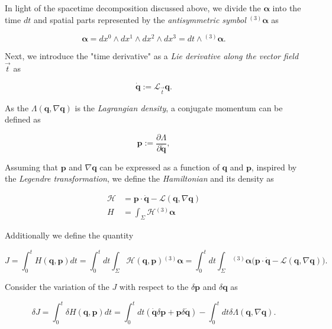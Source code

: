 In light of the spacetime decomposition discussed above, we divide the $\boldsymbol{\alpha}$ into the time $dt$ and spatial parts represented by the \textit{antisymmetric symbol} ${^{(3)}\boldsymbol{\alpha}}$ as 

\begin{equation}
\boldsymbol{\alpha} = dx^0 \wedge dx^1 \wedge dx^2 \wedge dx^3 = dt \wedge {^{(3)}\boldsymbol{\alpha}}.
\end{equation}

Next, we introduce the "time derivative" as a \textit{Lie derivative along the vector field} $\vec{t}$ as 

\begin{equation}
\dot{\boldsymbol{q}} := \mathcal{L}_{\vec{t}}\boldsymbol{q}.
\end{equation}

As the $\Lambda(\boldsymbol{q}, \nabla\boldsymbol{q})$ is the \textit{Lagrangian density}, a conjugate momentum can be defined as 

\begin{equation}
\boldsymbol{p} := \frac{\partial\Lambda}{\partial\dot{\boldsymbol{q}}},
\end{equation}

Assuming that $\boldsymbol{p}$ and $\nabla\boldsymbol{q}$ can be expressed as a function of $\boldsymbol{q}$ and $\boldsymbol{p}$, inspired by the \textit{Legendre transformation}, we define the \textit{Hamiltonian} and its density as

\begin{align}
\mathcal{H} &= \boldsymbol{p}\cdot\dot{\boldsymbol{q}} - \mathcal{L}(\boldsymbol{q}, \nabla\boldsymbol{q}) \\
H &= \int_{\Sigma}\mathcal{H}{^{(3)}\boldsymbol{\alpha}}
\end{align}

Additionally we define the quantity 

\begin{equation}
J = \int_{0}^{t}H(\boldsymbol{q},\boldsymbol{p})dt = \int_{0}^{t}dt\int_{\Sigma}\mathcal{H}(\boldsymbol{q},\boldsymbol{p}){^{(3)}\boldsymbol{\alpha}} = \int_{0}^{t}dt\int_{\Sigma}{^{(3)}\boldsymbol{\alpha}}\Big(\boldsymbol{p}\cdot\dot{\boldsymbol{q}} - \mathcal{L}(\boldsymbol{q},\nabla\boldsymbol{q})\Big).
\end{equation}

Consider the variation of the $J$ with respect to the $\delta\boldsymbol{p}$ and $\delta\boldsymbol{q}$ as

\begin{equation}
\delta J = \int_{0}^{t}\delta H(\boldsymbol{q},\boldsymbol{p})dt = \int_{0}^{t}dt (\dot{\boldsymbol{q}}\delta\boldsymbol{p}+\boldsymbol{p}\delta\dot{\boldsymbol{q}}) - \int_{0}^{t}dt\delta\Lambda(\boldsymbol{q}, \nabla\boldsymbol{q}).
\end{equation}

